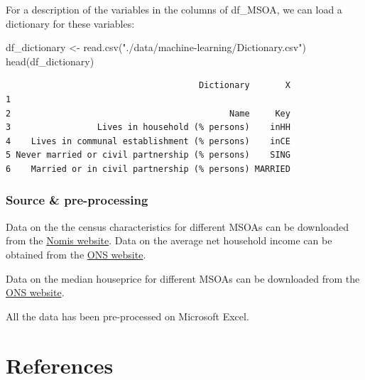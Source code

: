 \documentclass[
  letterpaper,
  DIV=11,
  numbers=noendperiod]{scrreprt}
\newenvironment{Shaded}{\begin{snugshade}}{\end{snugshade}}
\newcommand{\FunctionTok}[1]{\textcolor[rgb]{0.28,0.35,0.67}{#1}}
\newcommand{\NormalTok}[1]{\textcolor[rgb]{0.00,0.23,0.31}{#1}}
\newcommand{\OtherTok}[1]{\textcolor[rgb]{0.00,0.23,0.31}{#1}}
\newcommand{\StringTok}[1]{\textcolor[rgb]{0.13,0.47,0.30}{#1}}
\begin{document}
For a description of the variables in the columns of df\_MSOA, we can
load a dictionary for these variables:

\begin{Shaded}
\begin{Highlighting}[]
\NormalTok{df\_dictionary }\OtherTok{\textless{}{-}} \FunctionTok{read.csv}\NormalTok{(}\StringTok{"./data/machine{-}learning/Dictionary.csv"}\NormalTok{)}
\FunctionTok{head}\NormalTok{(df\_dictionary)}
\end{Highlighting}
\end{Shaded}

\begin{verbatim}
                                      Dictionary       X
1                                                       
2                                           Name     Key
3                 Lives in household (% persons)    inHH
4    Lives in communal establishment (% persons)    inCE
5 Never married or civil partnership (% persons)    SING
6    Married or in civil partnership (% persons) MARRIED
\end{verbatim}

\hypertarget{source-pre-processing-3}{%
\subsection*{Source \& pre-processing}\label{source-pre-processing-3}}

Data on the the census characteristics for different MSOAs can be
downloaded from the
\href{https://www.nomisweb.co.uk/census/2021/bulk}{Nomis website}. Data
on the average net household income can be obtained from the
\href{https://www.ons.gov.uk/employmentandlabourmarket/peopleinwork/earningsandworkinghours/datasets/smallareaincomeestimatesformiddlelayersuperoutputareasenglandandwales}{ONS
website}.

Data on the median houseprice for different MSOAs can be downloaded from
the
\href{https://www.ons.gov.uk/peoplepopulationandcommunity/housing/datasets/hpssadataset2medianhousepricebymsoaquarterlyrollingyear}{ONS
website}.

All the data has been pre-processed on Microsoft Excel.


\hypertarget{references}{%
\chapter*{References}\label{references}}
\end{document}
